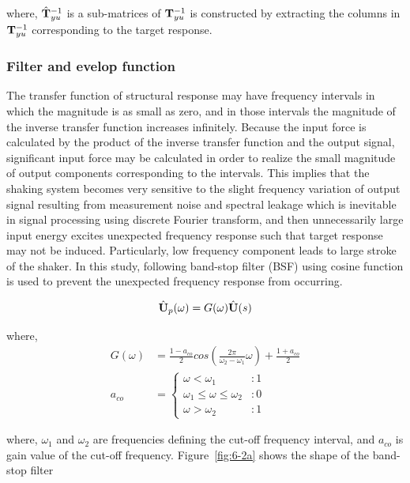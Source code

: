 where, $\hat{\mathbf{T}}_{yu}^{-1}$ is a sub-matrices of $\mathbf{T}_{yu}^{-1}$ is constructed by extracting the columns in $\mathbf{T}_{yu}^{-1}$ corresponding to the target response.

\subsubsection{Filter and evelop function}
The transfer function of structural response may have frequency intervals in which the magnitude is as small as zero, and in those intervals the magnitude of the inverse transfer function increases infinitely. Because the input force is calculated by the product of the inverse transfer function and the output signal, significant input force may be calculated in order to realize the small magnitude of output components corresponding to the intervals. This implies that the shaking system becomes very sensitive to the slight frequency variation of output signal resulting from measurement noise and spectral leakage which is inevitable in signal processing using discrete Fourier transform, and then unnecessarily large input energy excites unexpected frequency response such that target response may not be induced. Particularly, low frequency component leads to large stroke of the shaker. In this study, following band-stop filter (BSF) using cosine function is used to prevent the unexpected frequency response from occurring.

\begin{equation}\label{eq:6-5}
\hat{\mathbf{U}}_{p}(\omega) = G(\omega)\hat{\mathbf{U}}(s)
\end{equation}

where,
\begin{align}
G(\omega) &= \frac{1-a_{co}}{2}cos \left( \frac{2\pi}{\omega_{2}-\omega_{1}}\omega \right) + \frac{1+a_{co}}{2}\label{eq:6-6}\\
a_{co} &=\left\{\begin{array}{lr} \omega < \omega_{1} &: 1 \\ \omega_{1} \leq \omega \leq \omega_{2} &: 0 \\ \omega > \omega_{2} &: 1\end{array} \right.
\label{eq:6-7}
\end{align}

where, $\omega_{1}$ and $\omega_{2}$ are frequencies defining the cut-off frequency interval, and $a_{co}$ is gain value of the cut-off frequency. Figure~\ref{fig:6-2a} shows the shape of the band-stop filter


